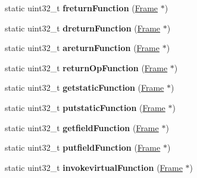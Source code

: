 \begin{DoxyCompactItemize}
\item 
static uint32\+\_\+t {\bfseries freturn\+Function} (\hyperlink{classFrame}{Frame} $\ast$)\hypertarget{classInstruction_ae02ff91aa74862aea7f2a1db8e1827ed}{}\label{classInstruction_ae02ff91aa74862aea7f2a1db8e1827ed}

\item 
static uint32\+\_\+t {\bfseries dreturn\+Function} (\hyperlink{classFrame}{Frame} $\ast$)\hypertarget{classInstruction_a7d8c07c528eb54dcfdf44222f3b0a28a}{}\label{classInstruction_a7d8c07c528eb54dcfdf44222f3b0a28a}

\item 
static uint32\+\_\+t {\bfseries areturn\+Function} (\hyperlink{classFrame}{Frame} $\ast$)\hypertarget{classInstruction_aba4a1f8834cc774e92d7189703361781}{}\label{classInstruction_aba4a1f8834cc774e92d7189703361781}

\item 
static uint32\+\_\+t {\bfseries return\+Op\+Function} (\hyperlink{classFrame}{Frame} $\ast$)\hypertarget{classInstruction_a4c2e47c0d662d7d6a42c17d5ec46bc41}{}\label{classInstruction_a4c2e47c0d662d7d6a42c17d5ec46bc41}

\item 
static uint32\+\_\+t {\bfseries getstatic\+Function} (\hyperlink{classFrame}{Frame} $\ast$)\hypertarget{classInstruction_aa24a713b08a24eb3b5e6102f9a1d032b}{}\label{classInstruction_aa24a713b08a24eb3b5e6102f9a1d032b}

\item 
static uint32\+\_\+t {\bfseries putstatic\+Function} (\hyperlink{classFrame}{Frame} $\ast$)\hypertarget{classInstruction_a16598010115d388ebc1c71899d8bd8d3}{}\label{classInstruction_a16598010115d388ebc1c71899d8bd8d3}

\item 
static uint32\+\_\+t {\bfseries getfield\+Function} (\hyperlink{classFrame}{Frame} $\ast$)\hypertarget{classInstruction_a994f185e4dc4052b6185c372fa7f2225}{}\label{classInstruction_a994f185e4dc4052b6185c372fa7f2225}

\item 
static uint32\+\_\+t {\bfseries putfield\+Function} (\hyperlink{classFrame}{Frame} $\ast$)\hypertarget{classInstruction_ad8077f8d97d2d540b66f7588a5f0a8c6}{}\label{classInstruction_ad8077f8d97d2d540b66f7588a5f0a8c6}

\item 
static uint32\+\_\+t {\bfseries invokevirtual\+Function} (\hyperlink{classFrame}{Frame} $\ast$)\hypertarget{classInstruction_a21e8d384cbf910442c125c71c90c2454}{}\label{classInstruction_a21e8d384cbf910442c125c71c90c2454}


\end{DoxyCompactItemize}
